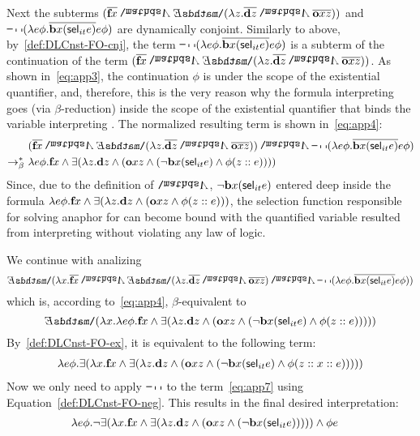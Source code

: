 Next the subterms $(\tr{\cfarmer \x1} \cnj2  \ex2 (\lambda \z1.  \tr{\cdonkey \z1}\cnj2 \tr{\cown \x1 \z1}  ) )$ and $ \n2 ( \lambda e \phi. \tr{\cbeat \x1  ( \selK_{it} e )} e \phi  ) $ are dynamically conjoint. Similarly to above, by~\eqref{def:DLCnst-FO-cnj}, the term $ \n2 ( \lambda e \phi. \tr{\cbeat \x1  ( \selK_{it} e )} e \phi  )$ is a subterm of the continuation of the term $(\tr{\cfarmer \x1}  \cnj2   \ex2 (\lambda \z1.  \tr{\cdonkey \z1}\cnj2 \tr{\cown \x1 \z1}  ) ) $.  As shown in~\eqref{eq:app3}, the continuation $\phi$ is under the scope of the existential quantifier, and, therefore, this is the very reason why the formula interpreting  goes (via $\beta$-reduction) inside the scope of the existential quantifier that binds the variable interpreting . The normalized resulting term is shown in~\eqref{eq:app4}:
\begin{align}
& (\tr{\cfarmer \x1}  \cnj2   \ex2 (\lambda \z1.  \tr{\cdonkey \z1}\cnj2 \tr{\cown \x1 \z1}  ) )  \cnj2  \n2 ( \lambda e \phi. \tr{\cbeat \x1  ( \selK_{it} e )} e \phi  )  \notag \\
 \bred \ &  \lambda e \phi. \cfarmer \x1  \cnj1 \ex1 ( \lambda \z1. \cdonkey \z1  \cnj1 ( \cown \x1  \z1 \cnj1 ( \n1 \cbeat  \x1 ( \selK_{it} e ) \cnj1 \phi  (\z1::e) ) ))\label{eq:app4}
\end{align}
Since, due to the definition of $\cnj2$,  $\n1 \cbeat  \x1 ( \selK_{it} e )$ entered deep inside the formula $   \lambda e \phi. \cfarmer \x1  \cnj1 \ex1 ( \lambda \z1. \cdonkey \z1  \cnj1 ( \cown \x1  \z1 \cnj1 \phi  (\z1::e) ) )$, the selection function responsible for solving anaphor for  can become bound with the quantified variable resulted from interpreting  without violating any law of logic. %

We continue with analizing $$\ex2 (\lambda \x1.  \tr{\cfarmer \x1} \cnj2   \ex2 (\lambda \z1.  \tr{\cdonkey \z1}\cnj2 \tr{\cown \x1 \z1}  )  \cnj2  \n2 ( \lambda e \phi. \tr{\cbeat \x1  ( \selK_{it} e )} e \phi  )) $$ which is, according to~\eqref{eq:app4}, $\beta$-equivalent to $$\ex2 (\lambda \x1. \lambda e \phi. \cfarmer \x1  \cnj1 \ex1 ( \lambda \z1. \cdonkey \z1  \cnj1 ( \cown \x1  \z1 \cnj1 ( \n1 \cbeat  \x1 ( \selK_{it} e ) \cnj1 \phi  (\z1::e) ) ))) $$ By~\eqref{def:DLCnst-FO-ex}, it is equivalent to the following term:
\begin{align}
\lambda e \phi. \ex1 (\lambda \x1.  \cfarmer \x1  \cnj1 \ex1 ( \lambda \z1. \cdonkey \z1  \cnj1 ( \cown \x1  \z1 \cnj1 ( \n1 \cbeat  \x1 ( \selK_{it} e ) \cnj1 \phi  (\z1::\x1::e) ) ))) \label{eq:app7}
\end{align}
Now we only need to apply $\n2$ to the term~\eqref{eq:app7} using Equation~\eqref{def:DLCnst-FO-neg}. This results in the final desired interpretation:
\begin{align}
& \lambda e \phi. \n1 \ex1 (\lambda \x1.  \cfarmer \x1  \cnj1 \ex1 ( \lambda \z1. \cdonkey \z1  \cnj1 ( \cown \x1  \z1 \cnj1 ( \n1 \cbeat  \x1 ( \selK_{it} e )  ) ))) \cnj1 \phi e \notag
\end{align}

